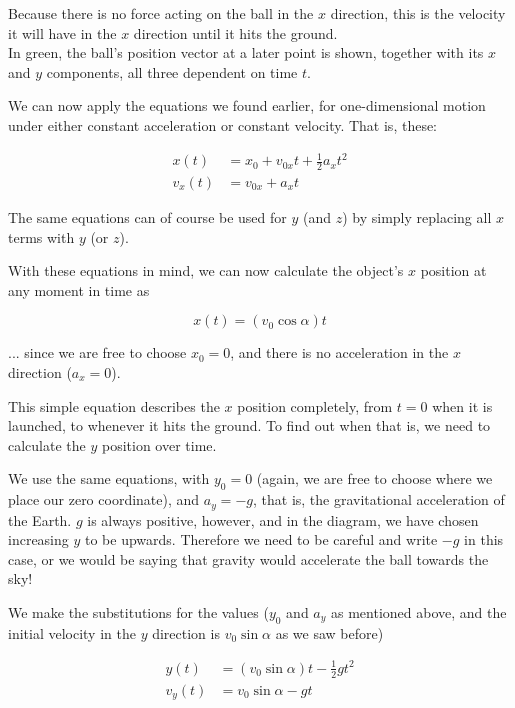 Because there is no force acting on the ball in the $x$ direction, this is the velocity it will have in the $x$ direction until it hits the ground.\\
In green, the ball's position vector at a later point is shown, together with its $x$ and $y$ components, all three dependent on time $t$.

We can now apply the equations we found earlier, for one-dimensional motion under either constant acceleration or constant velocity. That is, these:

\begin{align}
x(t) &= x_0 + v_{0x} t + \frac{1}{2} a_x t^2\\
v_x(t) &= v_{0x} + a_x t
\end{align}

The same equations can of course be used for $y$ (and $z$) by simply replacing all $x$ terms with $y$ (or $z$).

With these equations in mind, we can now calculate the object's $x$ position at any moment in time as

\begin{equation}
x(t) = (v_0 \cos \alpha) t
\end{equation}

... since we are free to choose $x_0 = 0$, and there is no acceleration in the $x$ direction ($a_x = 0$).

This simple equation describes the $x$ position completely, from $t=0$ when it is launched, to whenever it hits the ground. To find out when that is, we need to calculate the $y$ position over time.

We use the same equations, with $y_0 = 0$	 (again, we are free to choose where we place our zero coordinate), and $a_y = -g$, that is, the gravitational acceleration of the Earth. $g$ is always positive, however, and in the diagram, we have chosen increasing $y$ to be upwards. Therefore we need to be careful and write $-g$ in this case, or we would be saying that gravity would accelerate the ball towards the sky!

We make the substitutions for the values ($y_0$ and $a_y$ as mentioned above, and the initial velocity in the $y$ direction is $v_0 \sin \alpha$ as we saw before)

\begin{align}
y(t) &= (v_0 \sin \alpha) t - \frac{1}{2} g t^2\\
v_y(t) &= v_0 \sin \alpha - g t
\end{align}

